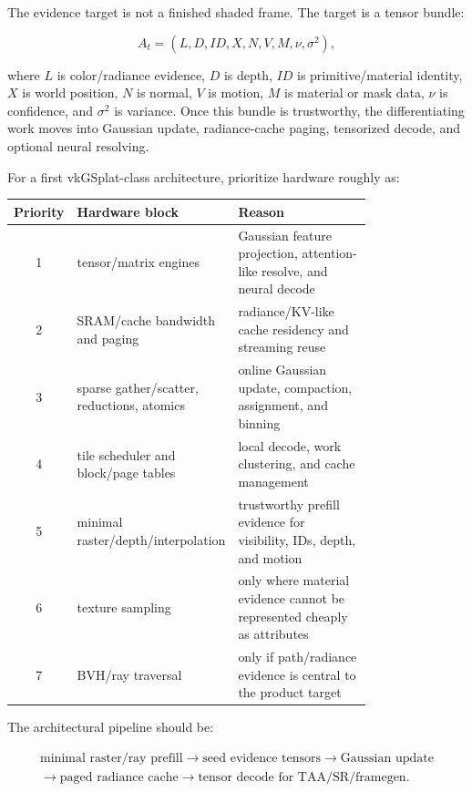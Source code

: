 \documentclass[11pt]{article}
\begin{document}
The evidence target is not a finished shaded frame. The target is a tensor
bundle:

\[
  A_t=(L,D,ID,X,N,V,M,\nu,\sigma^2),
\]

where $L$ is color/radiance evidence, $D$ is depth, $ID$ is primitive/material
identity, $X$ is world position, $N$ is normal, $V$ is motion, $M$ is material
or mask data, $\nu$ is confidence, and $\sigma^2$ is variance. Once this bundle
is trustworthy, the differentiating work moves into Gaussian update,
radiance-cache paging, tensorized decode, and optional neural resolving.

For a first vkGSplat-class architecture, prioritize hardware roughly as:

\begin{center}
\small
\begin{tabular}{cp{0.34\linewidth}p{0.44\linewidth}}
\toprule
Priority & Hardware block & Reason \\
\midrule
1 & tensor/matrix engines & Gaussian feature projection, attention-like resolve, and neural decode \\
2 & SRAM/cache bandwidth and paging & radiance/KV-like cache residency and streaming reuse \\
3 & sparse gather/scatter, reductions, atomics & online Gaussian update, compaction, assignment, and binning \\
4 & tile scheduler and block/page tables & local decode, work clustering, and cache management \\
5 & minimal raster/depth/interpolation & trustworthy prefill evidence for visibility, IDs, depth, and motion \\
6 & texture sampling & only where material evidence cannot be represented cheaply as attributes \\
7 & BVH/ray traversal & only if path/radiance evidence is central to the product target \\
\bottomrule
\end{tabular}
\end{center}

The architectural pipeline should be:

\[
\begin{gathered}
\text{minimal raster/ray prefill}
\rightarrow \text{seed evidence tensors}
\rightarrow \text{Gaussian update}\\
\rightarrow \text{paged radiance cache}
\rightarrow \text{tensor decode for TAA/SR/framegen}.
\end{gathered}
\]
\end{document}

